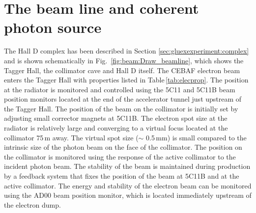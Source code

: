 
\section[The beam line and coherent photon source (Stuart)]{The beam line and coherent photon source \label{sec:beamline}}
The Hall D complex has been described in Section \ref{sec:gluexexperiment:complex} and is shown schematically in Fig.~\ref{fig:beam:Draw_beamline}, which shows the Tagger Hall, the collimator cave and Hall D itself. The CEBAF electron beam enters the Tagger Hall with properties listed in Table\,\ref{tab:elecprop}. The position at the radiator is monitored and
controlled using the 5C11 and 5C11B beam position monitors located at the end of the accelerator tunnel just upstream of the Tagger Hall. The position of the beam on the collimator
is initially set by adjusting small corrector magnets at 5C11B. The electron spot size at the radiator is relatively large and converging to a virtual focus located at the collimator 75\,m away. The virtual spot size ($\sim$ 0.5\,mm) is small compared to the intrinsic size of the photon beam on the face of the collimator. The position on the collimator is monitored using the response of 
the active collimator to the incident photon beam. The stability of the beam is maintained during production by a feedback system that fixes the position of the beam at 5C11B and at the active collimator. The energy and stability of the electron beam can be monitored using the AD00 beam position monitor, which is located immediately upstream of the electron dump.

